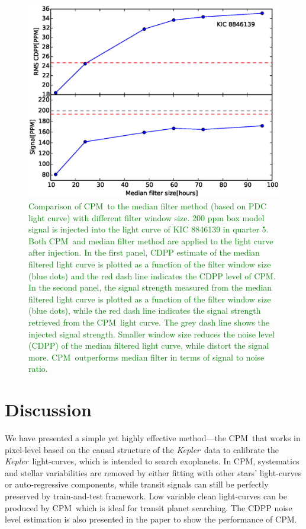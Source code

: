 \documentclass[12pt, preprint]{aastex}
\newcommand{\project}[1]{\textsl{#1}}
\newcommand{\Kepler}{\project{Kepler}}
\newcommand{\name}{CPM}
\newcommand{\revise}[1]{\textcolor{green}{#1}}
\begin{document}
\begin{figure}[p]
\begin{center}
\includegraphics[width=\textwidth]{f7a}
\end{center}
\caption{
  \label{filter} 
\revise{Comparison of \name\ to the median filter method (based on PDC light curve) with different filter window size. 200 ppm box model signal is injected into the light curve of KIC 8846139 in quarter 5. Both \name\ and median filter method are applied to the light curve after injection. In the first panel, CDPP estimate of the median filtered light curve is plotted as a function of the filter window size (blue dots) and the red dash line indicates the CDPP level of CPM. In the second panel, the signal strength measured from the median filtered light curve is plotted as a function of the filter window size (blue dots), while the red dash line indicates the signal strength retrieved from the \name\ light curve. The grey dash line shows the injected signal strength. Smaller window size reduces the noise level (CDPP) of the median filtered light curve, while distort the signal more. \name\ outperforms median filter in terms of signal to noise ratio.}
}
\end{figure}

\section{Discussion}
We have presented a simple yet highly effective method---the \name\ that works in pixel-level 
  based on the causal structure of the \Kepler\ data to calibrate the \Kepler\ light-curves, 
  which is intended to search exoplanets.
In \name, systematics and stellar variabilities are removed by
  either fitting with other stars' light-curves or auto-regressive components,
  while transit signals can still be perfectly preserved by train-and-test framework.
Low variable clean light-curves can be produced by \name\,  
  which is ideal for transit planet searching. 
The CDPP noise level estimation is also presented in the paper to show the performance of \name. 
\end{document}
